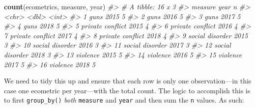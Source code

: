 \documentclass[
]{book}
\newenvironment{Shaded}{\begin{snugshade}}{\end{snugshade}}
\newcommand{\CommentTok}[1]{\textcolor[rgb]{0.56,0.35,0.01}{\textit{#1}}}
\newcommand{\KeywordTok}[1]{\textcolor[rgb]{0.13,0.29,0.53}{\textbf{#1}}}
\newcommand{\NormalTok}[1]{#1}
\begin{document}
\begin{Shaded}
\begin{Highlighting}[]
\KeywordTok{count}\NormalTok{(ecometrics, measure, year)}
\CommentTok{\#\textgreater{} \# A tibble: 16 x 3}
\CommentTok{\#\textgreater{}    measure           year     n}
\CommentTok{\#\textgreater{}    \textless{}chr\textgreater{}            \textless{}dbl\textgreater{} \textless{}int\textgreater{}}
\CommentTok{\#\textgreater{}  1 guns              2015     5}
\CommentTok{\#\textgreater{}  2 guns              2016     5}
\CommentTok{\#\textgreater{}  3 guns              2017     5}
\CommentTok{\#\textgreater{}  4 guns              2018     5}
\CommentTok{\#\textgreater{}  5 private conflict  2015     4}
\CommentTok{\#\textgreater{}  6 private conflict  2016     4}
\CommentTok{\#\textgreater{}  7 private conflict  2017     4}
\CommentTok{\#\textgreater{}  8 private conflict  2018     4}
\CommentTok{\#\textgreater{}  9 social disorder   2015     3}
\CommentTok{\#\textgreater{} 10 social disorder   2016     3}
\CommentTok{\#\textgreater{} 11 social disorder   2017     3}
\CommentTok{\#\textgreater{} 12 social disorder   2018     3}
\CommentTok{\#\textgreater{} 13 violence          2015     5}
\CommentTok{\#\textgreater{} 14 violence          2016     5}
\CommentTok{\#\textgreater{} 15 violence          2017     5}
\CommentTok{\#\textgreater{} 16 violence          2018     5}
\end{Highlighting}
\end{Shaded}

We need to tidy this up and ensure that each row is only one observation---in this case one ecometric per year---with the total count. The logic to accomplish this is to first \texttt{group\_by()} \emph{both} \texttt{measure} and \texttt{year} and then sum the \texttt{n} values. As such:
\end{document}
